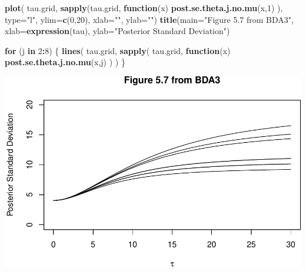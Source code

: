 \documentclass[]{article}
\newenvironment{Shaded}{\begin{snugshade}}{\end{snugshade}}
\newcommand{\KeywordTok}[1]{\textcolor[rgb]{0.13,0.29,0.53}{\textbf{#1}}}
\newcommand{\DataTypeTok}[1]{\textcolor[rgb]{0.13,0.29,0.53}{#1}}
\newcommand{\DecValTok}[1]{\textcolor[rgb]{0.00,0.00,0.81}{#1}}
\newcommand{\StringTok}[1]{\textcolor[rgb]{0.31,0.60,0.02}{#1}}
\newcommand{\ControlFlowTok}[1]{\textcolor[rgb]{0.13,0.29,0.53}{\textbf{#1}}}
\newcommand{\OperatorTok}[1]{\textcolor[rgb]{0.81,0.36,0.00}{\textbf{#1}}}
\newcommand{\NormalTok}[1]{#1}
\begin{document}
\begin{Shaded}
\begin{Highlighting}[]
\KeywordTok{plot}\NormalTok{( tau.grid, }\KeywordTok{sapply}\NormalTok{(tau.grid, }\ControlFlowTok{function}\NormalTok{(x) }\KeywordTok{post.se.theta.j.no.mu}\NormalTok{(x,}\DecValTok{1}\NormalTok{) ), }
      \DataTypeTok{type=}\StringTok{"l"}\NormalTok{, }\DataTypeTok{ylim=}\KeywordTok{c}\NormalTok{(}\DecValTok{0}\NormalTok{,}\DecValTok{20}\NormalTok{),}
      \DataTypeTok{xlab=}\StringTok{""}\NormalTok{, }\DataTypeTok{ylab=}\StringTok{""}\NormalTok{)}
\KeywordTok{title}\NormalTok{(}\DataTypeTok{main=}\StringTok{"Figure 5.7 from BDA3"}\NormalTok{, }
      \DataTypeTok{xlab=}\KeywordTok{expression}\NormalTok{(tau), }
      \DataTypeTok{ylab=}\StringTok{"Posterior Standard Deviation"}\NormalTok{)}

\ControlFlowTok{for}\NormalTok{ (j }\ControlFlowTok{in} \DecValTok{2}\OperatorTok{:}\DecValTok{8}\NormalTok{) \{ }
  \KeywordTok{lines}\NormalTok{( tau.grid, }
         \KeywordTok{sapply}\NormalTok{( tau.grid, }\ControlFlowTok{function}\NormalTok{(x) }\KeywordTok{post.se.theta.j.no.mu}\NormalTok{(x,j) ) )}
\NormalTok{\}}
\end{Highlighting}
\end{Shaded}

\includegraphics{Untitled_files/figure-latex/unnamed-chunk-10-2.pdf}
\end{document}
